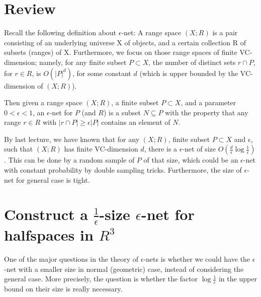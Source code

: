 \documentclass[11pt]{article}
\begin{document}
\setlength{\fboxrule}{.5mm}\setlength{\fboxsep}{1.2mm}
\newlength{\boxlength}\setlength{\boxlength}{\textwidth}
\addtolength{\boxlength}{-4mm}
\begin{center}\end{center}
\vspace{5mm}

\section{Review}
Recall the following definition about $\epsilon$-net:
A range space $(X;R)$ is a pair consisting of an underlying universe X of objects, and a certain collection
	R of subsets (ranges) of X. 
Furthermore, we focus on those range spaces of finite  VC-dimension; namely, for any finite subset $P\subset X$, the number of distinct sets $r\cap P$,
for $r\in R$, is $O(|P|^d)$, for some constant $d$ (which is upper bounded by the VC-dimension of $(X;R)$).

Then given a range space $(X;R)$, a finite subset $P \subset X$, and a parameter $0 < \epsilon < 1$, an $\epsilon$-net for $P$ (and
$R$) is a subset $N \subseteq P$ with the property that any range $r \in R$ with $|r\cap P|\geq \epsilon|P|$ contains an element
of $N$. 

By last lecture, we have known that for any $(X;R)$, finite subset $P\subset X$ and $\epsilon$, such
	that $(X;R)$ has finite  VC-dimension $d$,
	there is a $\epsilon$-net of size $O(\frac{d}{\epsilon}\log \frac{1}{\epsilon})$. 
This can be done by a random
	sample of $P$ of that size, which could be an $\epsilon$-net with constant probability by
	double sampling tricks. 
Furthermore, the size of $\epsilon$-net for general case is tight.

\section{Construct a $\frac{1}{\epsilon}$-size $\epsilon$-net for halfspaces in $R^3$}


One of the major questions in the theory of $\epsilon$-nets is whether we could have 
	the $\epsilon$-net with a smaller size in normal (geometric) case, instead of considering the general case.
More precisely, the question is whether the factor $\log \frac{1}{\epsilon}$
	 in the upper bound on their size is really necessary.
\end{document}
